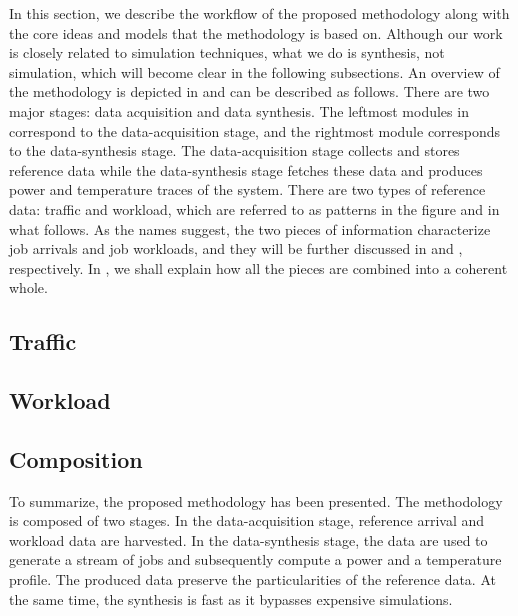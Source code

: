 In this section, we describe the workflow of the proposed methodology along with
the core ideas and models that the methodology is based on. Although our work is
closely related to simulation techniques, what we do is synthesis, not
simulation, which will become clear in the following subsections. An overview of
the methodology is depicted in  and can be described as
follows. There are two major stages: data acquisition and data synthesis. The
leftmost modules in  correspond to the data-acquisition stage,
and the rightmost module corresponds to the data-synthesis stage. The
data-acquisition stage collects and stores reference data while the
data-synthesis stage fetches these data and produces power and temperature
traces of the system. There are two types of reference data: traffic and
workload, which are referred to as patterns in the figure and in what follows.
As the names suggest, the two pieces of information characterize job arrivals
and job workloads, and they will be further discussed in  and
, respectively. In , we shall explain how all
the pieces are combined into a coherent whole.

\subsection{Traffic} 


\subsection{Workload} 


\subsection{Composition} 


To summarize, the proposed methodology has been presented. The methodology is
composed of two stages. In the data-acquisition stage, reference arrival and
workload data are harvested. In the data-synthesis stage, the data are used to
generate a stream of jobs and subsequently compute a power and a temperature
profile. The produced data preserve the particularities of the reference data.
At the same time, the synthesis is fast as it bypasses expensive simulations.
